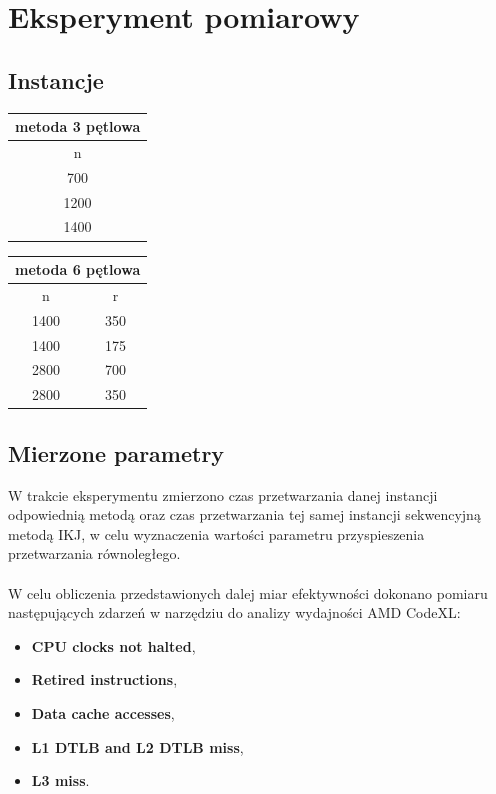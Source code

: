 \documentclass[12pt,a4paper]{article}
\begin{document}
\section{Eksperyment pomiarowy}

\subsection{Instancje}

\begin{table}[H]
\centering
\def\arraystretch{1.5}
\begin{tabular}{|c|}
\hline
metoda 3 pętlowa \\
\hline
n \\
\hline
700 \\
\hline
1200 \\
\hline
1400 \\
\hline
\end{tabular}
\hspace{70pt}
\begin{tabular}{|c|c|}  %
\hline
\multicolumn{2}{|c|}{metoda 6 pętlowa} \\
\hline
n & r\\
\hline
1400 & 350 \\
\hline
1400 & 175 \\
\hline
2800 & 700 \\
\hline
2800 & 350 \\
\hline
\end{tabular}
\end{table}

\subsection{Mierzone parametry}

W trakcie eksperymentu zmierzono czas przetwarzania danej instancji odpowiednią metodą oraz czas przetwarzania tej samej instancji sekwencyjną metodą IKJ, w celu wyznaczenia wartości parametru przyspieszenia przetwarzania równoległego.\\
\\
W celu obliczenia przedstawionych dalej miar efektywności dokonano pomiaru następujących zdarzeń w narzędziu do analizy wydajności AMD CodeXL:

\begin{itemize}
\item \textbf{CPU clocks not halted},
\item \textbf{Retired instructions},
\item \textbf{Data cache accesses},
\item \textbf{L1 DTLB and L2 DTLB miss},
\item \textbf{L3 miss}.
\end{itemize}
\end{document}
